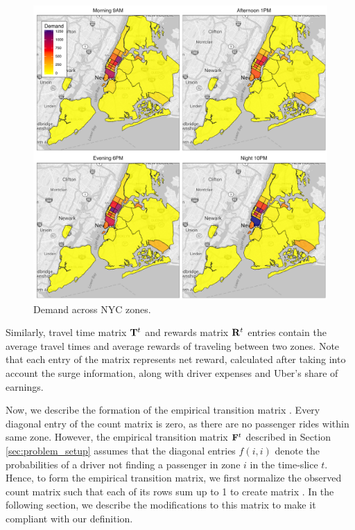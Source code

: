 \begin{figure}
	\centering
	\caption{Demand across NYC zones.}
	\label{fig:demand_heatmap}
	\includegraphics[scale=0.4]{figures/demand_heatmap.pdf}
\end{figure}

Similarly, travel time matrix ${\mathbf{T}}^t$ and rewards matrix ${\mathbf{R}}^t$ entries contain the average travel times and average rewards of traveling between two zones. Note that each entry of the {\rewardsmatrix} matrix represents net reward, calculated after taking into account the surge information, along with driver expenses and Uber's share of earnings.

Now, we describe the formation of the empirical transition matrix {\empiricaltransitionmatrix}. Every diagonal entry of the count matrix {\countmatrix} is zero, as there are no passenger rides within same zone. However, the empirical transition matrix {${\mathbf{F}}^t$} described in Section \ref{sec:problem_setup} assumes that the diagonal entries $f(i,i)$ denote the probabilities of a driver not finding a passenger in zone $i$ in the time-slice $t$. Hence, to form the empirical transition matrix, we first normalize the observed count matrix such that each of its rows sum up to 1 to create matrix {\empiricaltransitionmatrix}. In the following section, we describe the modifications to this matrix to make it compliant with our definition.

